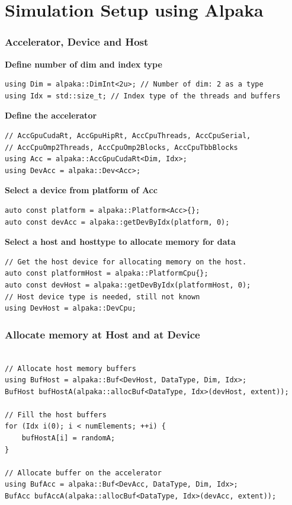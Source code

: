 \documentclass[9pt]{beamer}
\begin{document}
\section{Simulation Setup using Alpaka}
\begin{frame}[fragile]
\frametitle{Accelerator, Device and Host}
\textbf{Define number of dim and index type}
\begin{lstlisting}
using Dim = alpaka::DimInt<2u>; // Number of dim: 2 as a type
using Idx = std::size_t; // Index type of the threads and buffers
\end{lstlisting}

\textbf{Define the accelerator}
\begin{lstlisting}
// AccGpuCudaRt, AccGpuHipRt, AccCpuThreads, AccCpuSerial,
// AccCpuOmp2Threads, AccCpuOmp2Blocks, AccCpuTbbBlocks 
using Acc = alpaka::AccGpuCudaRt<Dim, Idx>;
using DevAcc = alpaka::Dev<Acc>;
\end{lstlisting}
\textbf{Select a device from platform of Acc}
\begin{lstlisting}
auto const platform = alpaka::Platform<Acc>{};
auto const devAcc = alpaka::getDevByIdx(platform, 0);
\end{lstlisting}
\textbf{Select a host and hosttype to allocate memory for data}
\begin{lstlisting}
// Get the host device for allocating memory on the host.
auto const platformHost = alpaka::PlatformCpu{};
auto const devHost = alpaka::getDevByIdx(platformHost, 0);
// Host device type is needed, still not known
using DevHost = alpaka::DevCpu;
\end{lstlisting}
\end{frame}

 \begin{frame}[fragile]
\frametitle{Allocate memory at Host and at Device}

\begin{lstlisting}

// Allocate host memory buffers
using BufHost = alpaka::Buf<DevHost, DataType, Dim, Idx>;
BufHost bufHostA(alpaka::allocBuf<DataType, Idx>(devHost, extent));
 
// Fill the host buffers
for (Idx i(0); i < numElements; ++i) {
    bufHostA[i] = randomA;
}

// Allocate buffer on the accelerator
using BufAcc = alpaka::Buf<DevAcc, DataType, Dim, Idx>;
BufAcc bufAccA(alpaka::allocBuf<DataType, Idx>(devAcc, extent));
\end{lstlisting}
\end{frame}
\end{document}
